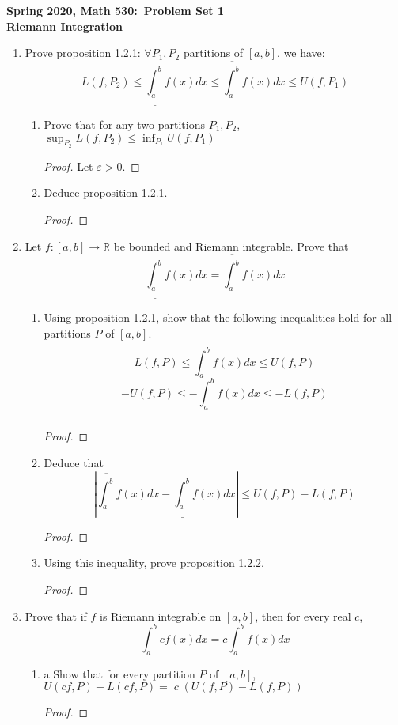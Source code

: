 \documentclass{article}
\newcommand{\R}{\mathbb{R}}
\newcommand{\<}{\langle}
\renewcommand{\>}{\rangle}
\newcommand{\lowint}[2]{\underline{\int_{#1}^{#2}}}
\newcommand{\upint}[2]{\overline{\int_{#1}^{#2}}}
\begin{document}
\begin{center}
    \textbf{Spring 2020, Math 530:\ Problem Set 1} \\
    \textbf{Riemann Integration} \\
\end{center}

\begin{enumerate}[(E1)]
    \item Prove proposition 1.2.1: $\forall P_1,P_2$ partitions of $[a,b]$, we have:
    $$
    L(f,P_2) \leq \lowint{a}{b} f(x)dx \leq \upint{a}{b} f(x)dx \leq U(f,P_1)
    $$
    \begin{enumerate}
    \item Prove that for any two partitions $P_1,P_2$, $\sup_{P_2} L(f,P_2) \leq \inf_{P_1}U(f,P_1)$
    \begin{proof}
    Let $\varepsilon > 0$.
    \end{proof}
    \item Deduce proposition 1.2.1.
    \begin{proof}
        
    \end{proof}
    \end{enumerate}
    \item Let $f : [a,b] \to \R$ be bounded and Riemann integrable. Prove that 
    $$\lowint{a}{b}f(x)dx = \upint{a}{b}f(x)dx$$
    \begin{enumerate}
    \item
    Using proposition 1.2.1, show that the following inequalities hold for all partitions $P$ of $[a,b]$.
    $$ L(f,P) \leq \upint{a}{b} f(x)dx \leq U(f,P)$$
    $$-U(f,P) \leq -\lowint{a}{b} f(x)dx \leq -L(f,P)$$
    \begin{proof}
        
    \end{proof}
    \item 
    Deduce that 
    $$ \left| \upint{a}{b}f(x)dx - \lowint{a}{b}f(x)dx \right| \leq U(f,P) - L(f,P)$$    
    \begin{proof}

    \end{proof}
    \item Using this inequality, prove proposition 1.2.2.
    \begin{proof}
        
    \end{proof}

    \end{enumerate}
    \item Prove that if $f$ is Riemann integrable on $[a,b]$, then for every real $c$,
    $$
    \int_{a}^{b}cf(x)dx = c\int_{a}^{b}f(x)dx
    $$
    \begin{enumerate}
    \item a
    Show that for every partition $P$ of $[a,b]$, $U(cf,P) - L(cf,P) = |c|(U(f,P) - L(f,P))$
    \begin{proof}
        

\end{proof}
\end{enumerate}
\end{enumerate}
\end{document}
